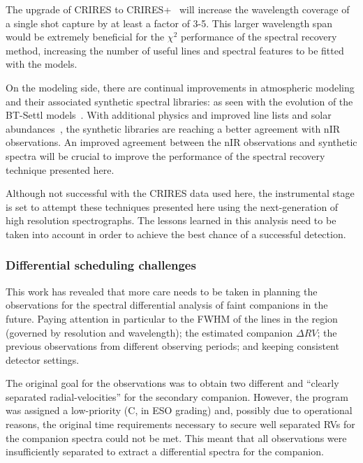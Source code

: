 \documentclass[fleqn,usenatbib]{mnras}
\begin{document}
The upgrade of CRIRES to CRIRES+~\citep{dorn_crires_2016} will increase the wavelength coverage of a single shot capture by at least a factor of 3-5. This larger wavelength span would be extremely beneficial for the \(\chi^2\) performance of the spectral recovery method, increasing the number of useful lines and spectral features to be fitted with the models. 

On the modeling side, there are continual improvements in atmospheric modeling and their associated synthetic spectral libraries: as seen with the evolution of the BT-Settl models~\cite{allard_btsettl_2013}. With additional physics and improved line lists and solar abundances~\citep[e.g.][]{asplund_chemical_2009,caffau_solar_2011}, the synthetic libraries are reaching a better agreement with nIR observations. An improved agreement between the nIR observations and synthetic spectra will be crucial to improve the performance of the spectral recovery technique presented here.

Although not successful with the CRIRES data used here, the instrumental stage is set to attempt these techniques presented here using the next-generation of high resolution spectrographs. The lessons learned in this analysis need to be taken into account in order to achieve the best chance of a successful detection. 

\subsubsection{Differential scheduling challenges}
\label{subsubsec:differential scedualing}
This work has revealed that more care needs to be taken in planning the observations for the spectral differential analysis of faint companions in the future. Paying attention in particular to the FWHM of the lines in the region (governed by resolution and wavelength); the estimated companion \(\Delta RV \); the previous observations from different observing periods; and keeping consistent detector settings.

The original goal for the observations was to obtain two different and ``clearly separated radial-velocities'' for the secondary companion. However, the program was assigned a low-priority (C, in ESO grading) and, possibly due to operational reasons, the original time requirements necessary to secure well separated RVs for the companion spectra could not be met. This meant that all observations were insufficiently separated to extract a differential spectra for the companion.
\end{document}
